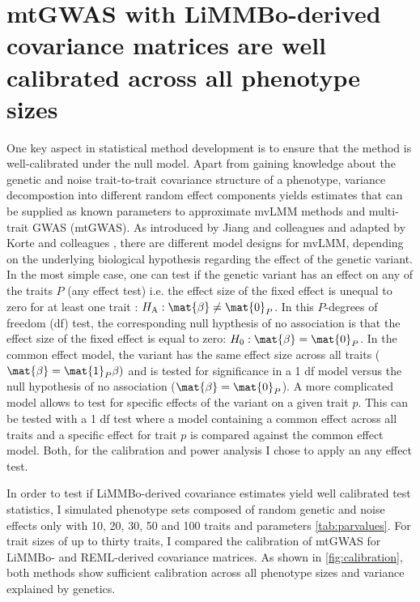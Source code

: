 \section{mtGWAS with LiMMBo-derived covariance matrices are well calibrated across all phenotype sizes}
\label{section:calibration-limmbo}
One key aspect in statistical method development is to ensure that the method is well-calibrated under the null model. Apart from gaining knowledge about the genetic and noise trait-to-trait covariance structure of a phenotype, variance decompostion into different random effect components yields estimates that can be supplied as known parameters to approximate mvLMM methods and multi-trait GWAS (mtGWAS). As introduced by Jiang and colleagues \citeyear{Jiang1995} and adapted by Korte and colleagues \citeyear{Korte2012}, there are different model designs for mvLMM, depending on the underlying biological hypothesis regarding the effect of the genetic variant. In the most simple case, one can test if the genetic variant has an effect on any of the traits \(P\) (any effect test) i.e. the effect size of the fixed effect is unequal to zero for at least one trait : \(H_\text{A}: \mat{\beta} \ne \mat{0}_P\).  In this \(P\)-degrees of freedom (df) test, the corresponding null hypthesis of no association is that the effect size of the fixed effect is equal to zero: \(H_0:\mat{\beta}  = \mat{0}_P\). In the common effect model, the variant has the same effect size across all traits (\(\mat{\beta}  = \mat{1}_P\beta)\) and is tested for significance in a \num{1} df model versus the null hypothesis of no association (\(\mat{\beta}  = \mat{0}_P\)). A more complicated model allows to test for specific effects of the variant on a given trait \(p\). This can be tested with a \num{1} df test where a model containing a common effect across all traits and a specific effect for trait \(p\) is compared against the common effect model. Both, for the calibration and power analysis I chose to apply an any effect test.

In order to test if LiMMBo-derived covariance estimates yield well calibrated test statistics, I simulated phenotype sets composed of random genetic and noise effects only with \num{10}, \num{20}, \num{30}, \num{50} and \num{100} traits and parameters \cref{tab:parvalues}. For trait sizes of up to thirty traits, I compared the calibration of mtGWAS for LiMMBo- and REML-derived covariance matrices. As shown in \cref{fig:calibration}, both methods show sufficient calibration across all phenotype sizes and variance explained by genetics. 

